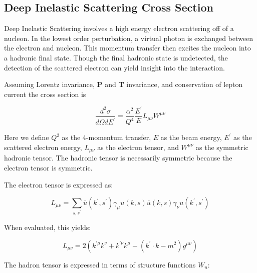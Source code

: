 
\subsection{Deep Inelastic Scattering Cross Section}

Deep Inelastic Scattering involves a high energy electron scattering off of a nucleon. In the lowest order perturbation, a virtual photon is exchanged between the electron and nucleon. This momentum transfer then excites the nucleon into a hadronic final state. Though the final hadronic state is undetected, the detection of the scattered electron can yield insight into the interaction.

Assuming Lorentz invariance, \textbf{P} and \textbf{T} invariance, and conservation of lepton current the cross section is

\begin{equation}
	\frac{d^2\sigma}{d\Omega dE^\prime} = \frac{\alpha^2}{Q^4}\frac{E^\prime}{E} L_{\mu\nu}W^{\mu\nu}
\end{equation}

Here we define $Q^2$ as the 4-momentum transfer, $E$ as the beam energy, $E^\prime$ as the scattered electron energy, $L_{\mu\nu}$ as the electron tensor, and $W^{\mu\nu}$ as the symmetric hadronic tensor. The hadronic tensor is necessarily symmetric because the electron tensor is symmetric.

The electron tensor is expressed as:

\begin{equation}
	L_{\mu\nu} = \sum_{s,s^\prime}\overline{u}\left(k^\prime,s^\prime\right)\gamma_{\mu}u\left(k,s\right)\overline{u}\left(k,s\right)\gamma_{\nu}u\left(k^\prime,s^\prime\right)
\end{equation}

When evaluated, this yields:

\begin{equation}
	L_{\mu\nu} = 2\left(k^{\prime\mu}k^{\nu} + k^{\prime\nu}k^{\mu} - \left(k^{\prime}\cdot k - m^{2}\right)g^{\mu\nu}\right)
\end{equation}

The hadron tensor is expressed in terms of structure functions $W_n$:

